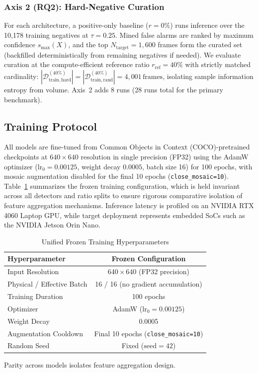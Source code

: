 \documentclass[conference]{IEEEtran}
\begin{document}
\subsubsection{Axis 2 (RQ2): Hard-Negative Curation}
For each architecture, a positive-only baseline ($r{=}0\%$) runs inference over the 10,178 training negatives at $\tau{=}0.25$. Mined false alarms are ranked by maximum confidence $s_{\max}(X)$, and the top $N_{\mathrm{target}}{=}1{,}600$ frames form the curated set (backfilled deterministically from remaining negatives if needed). We evaluate curation at the compute-efficient reference ratio $r_{\mathrm{ref}}{=}40\%$ with strictly matched cardinality: $|\mathcal{D}_{\mathrm{train,hard}}^{(40\%)}| = |\mathcal{D}_{\mathrm{train,rand}}^{(40\%)}| = 4{,}001\,\text{frames}$, isolating sample information entropy from volume. Axis~2 adds 8 runs (28 runs total for the primary benchmark).

\subsection{Training Protocol}
\label{subsec:protocol}
All models are fine-tuned from Common Objects in Context (COCO)-pretrained checkpoints at $640 \times 640$
resolution in single precision (FP32) using the AdamW optimizer ($\mathrm{lr}_0 = 0.00125$,
weight decay $0.0005$, batch size 16) for 100 epochs, with mosaic augmentation
disabled for the final 10 epochs (\texttt{close\_mosaic=10}). Table~\ref{tab:training}
summarizes the frozen training configuration, which is held invariant across all
detectors and ratio splits to ensure rigorous comparative isolation of feature
aggregation mechanisms. Inference latency is profiled on an NVIDIA RTX 4060
Laptop GPU, while target deployment represents embedded SoCs such as the NVIDIA
Jetson Orin Nano.

\begin{table}[t]
\caption{Unified Frozen Training Hyperparameters}
\label{tab:training}
\centering
\setlength{\tabcolsep}{5pt}
\begin{tabular}{lc}
\toprule
\textbf{Hyperparameter} & \textbf{Frozen Configuration} \\
\midrule
Input Resolution & 640\,$\times$\,640 (FP32 precision) \\
Physical / Effective Batch & 16 / 16 (no gradient accumulation) \\
Training Duration & 100 epochs \\
Optimizer & AdamW ($\mathrm{lr}_0{=}0.00125$) \\
Weight Decay & 0.0005 \\
Augmentation Cooldown & Final 10 epochs (\texttt{close\_mosaic=10}) \\
Random Seed & Fixed ($\text{seed}{=}42$) \\
\bottomrule
\end{tabular}
\vspace{1pt}
{\footnotesize Parity across models isolates feature aggregation design.}
\end{table}
\end{document}

